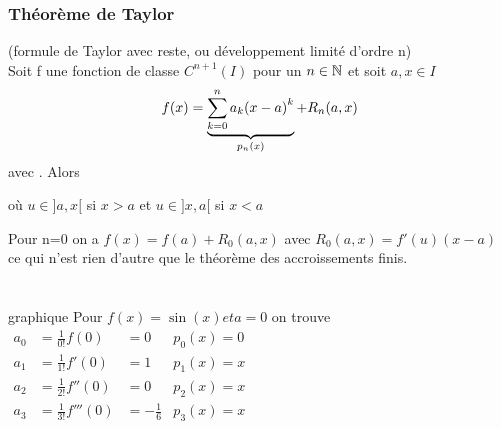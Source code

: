 \documentclass[12pt,a4paper]{article}
\begin{document}
{\subsubsection{Théorème de Taylor}
\begin{boite}
	\Theoreme (formule de Taylor avec reste, ou développement limité d'ordre n)\\
	Soit f une fonction de classe $C^{n+1}(I)$ pour un $n \in \N$ et soit $a,x \in I$
	\begin{equation}
		f(x) = \underbrace{\somme{n}{k=0}{a_k(x-a)}^k}_{p_n(x)}+R_n(a,x)
	\end{equation}
	avec . Alors 
	\begin{center}
	\end{center}
	où $u \in ]a,x[$ si $x>a$ et $u\in ]x,a[$ si $x< a$
\end{boite}
 Pour n=0 on a $f(x) = f(a) + R_0(a,x)$ avec $R_0(a,x) = f'(u)(x-a)$ ce qui n'est rien d'autre que le théorème des accroissements finis.\\
\\
\\
{graphique}
Pour $f(x) = \sin(x) et a=0$ on trouve\\
$\begin{array}{lllr}
a_0 & = \frac{1}{0!}f(0) & =0 & p_0(x)=0\\
a_1 & = \frac{1}{1!}f'(0) & =1 & p_1(x)=x\\
a_2 & = \frac{1}{2!}f''(0) & =0 & p_2(x)=x\\
a_3 & = \frac{1}{3!}f'''(0) & =-\frac{1}{6} & p_3(x)=x\\
\end{array}$
}
\end{document}
